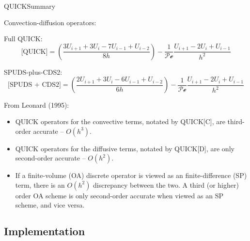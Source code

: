\documentclass[aspectratio=169, sectionpages, codemintedoverleaf, bibref]{beamer}
\begin{document}
\begin{frame}{QUICK}{Summary}

    \remarks Convection-diffusion operators:

    Full QUICK: \begin{equation}
        \text{[QUICK]} = \left( \frac{3 U_{i+1} + 3 U_i - 7 U_{i-1} + U_{i-2}}{8h} \right) - \frac{1}{\mathcal{Pe}} \frac{ U_{i+1} - 2 U_i + U_{i-1} }{h^2}
    \end{equation}

    SPUDS-plus-CDS2: \begin{equation}
        \text{[SPUDS + CDS2]} = \left( \frac{2 U_{i+1} + 3 U_i - 6 U_{i-1} + U_{i-2}}{6h} \right) - \frac{1}{\mathcal{Pe}} \frac{ U_{i+1} - 2 U_i + U_{i-1} }{h^2}
    \end{equation}

    \framebreak
    
    \remarks From Leonard (1995):
    \begin{itemize}
        \item QUICK operators for the convective terms, notated by QUICK[C], are third-order accurate -- $O(h^3)$.
        \item QUICK operators for the diffusive terms, notated by QUICK[D], are only second-order accurate -- $O(h^2)$.
        \item If a finite-volume (OA) discrete operator is viewed as an finite-difference (SP) term, there is an $O(h^2)$ discrepancy between the two. A third (or higher) order OA scheme is only second-order accurate when viewed as an SP scheme, and vice versa.
    \end{itemize}
    
\end{frame}

\subsection{Implementation}

\end{document}
